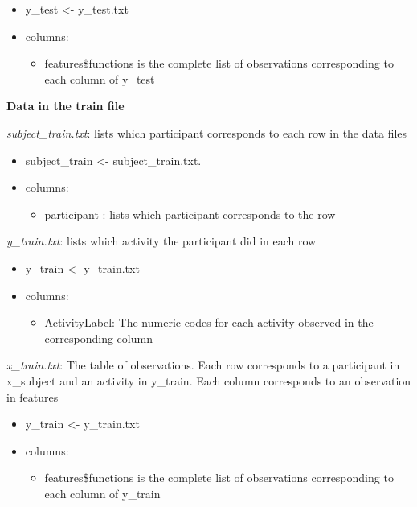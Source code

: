 \documentclass[
]{article}
\providecommand{\tightlist}{%
  \setlength{\itemsep}{0pt}\setlength{\parskip}{0pt}}
\begin{document}
\begin{itemize}
\tightlist
\item
  y\_test \textless- y\_test.txt\\
\item
  columns:

  \begin{itemize}
  \tightlist
  \item
    features\$functions is the complete list of observations
    corresponding to each column of y\_test
  \end{itemize}
\end{itemize}

\textbf{Data in the train file}

\emph{subject\_train.txt}: lists which participant corresponds to each
row in the data files

\begin{itemize}
\tightlist
\item
  subject\_train \textless- subject\_train.txt.
\item
  columns:

  \begin{itemize}
  \tightlist
  \item
    participant : lists which participant corresponds to the row
  \end{itemize}
\end{itemize}

\emph{y\_train.txt}: lists which activity the participant did in each
row

\begin{itemize}
\tightlist
\item
  y\_train \textless- y\_train.txt\\
\item
  columns:

  \begin{itemize}
  \tightlist
  \item
    ActivityLabel: The numeric codes for each activity observed in the
    corresponding column
  \end{itemize}
\end{itemize}

\emph{x\_train.txt}: The table of observations. Each row corresponds to
a participant in x\_subject and an activity in y\_train. Each column
corresponds to an observation in features

\begin{itemize}
\tightlist
\item
  y\_train \textless- y\_train.txt\\
\item
  columns:

  \begin{itemize}
  \tightlist
  \item
    features\$functions is the complete list of observations
    corresponding to each column of y\_train
  \end{itemize}
\end{itemize}
\end{document}
